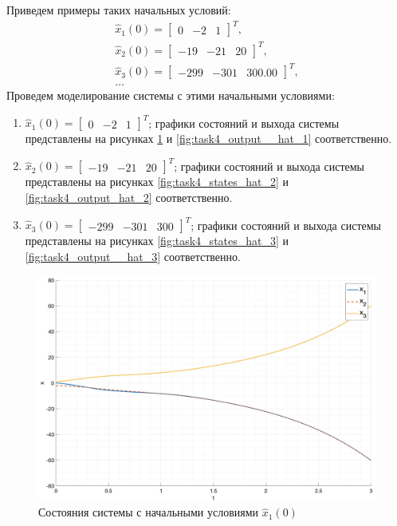 Приведем примеры таких начальных условий:
\begin{equation}
    \begin{array}{cc}
        \hat{x}_1(0) = \begin{bmatrix}
            0 & -2 & 1
        \end{bmatrix}^T, \\
        \hat{x}_2(0) = \begin{bmatrix}
            -19 & -21 & 20
        \end{bmatrix}^T, \\
        \hat{x}_3(0) = \begin{bmatrix}
            -299 & -301 & 300.00 
        \end{bmatrix}^T, \\
        \ldots
    \end{array}
\end{equation}
Проведем моделирование системы с этими начальными условиями: 
\begin{enumerate}
    \item $\hat{x}_1(0) = \begin{bmatrix}
        0 & -2 & 1
    \end{bmatrix}^T$; графики состояний и выхода системы представлены на рисунках \ref{fig:task4_states_hat_1} и \ref{fig:task4_output__hat_1} соответственно.
    \item $\hat{x}_2(0) = \begin{bmatrix}
        -19 & -21 & 20
    \end{bmatrix}^T$; графики состояний и выхода системы представлены на рисунках \ref{fig:task4_states_hat_2} и \ref{fig:task4_output_hat_2} соответственно.
    \item $\hat{x}_3(0) = \begin{bmatrix}
        -299 & -301 & 300 
    \end{bmatrix}^T$; графики состояний и выхода системы представлены на рисунках \ref{fig:task4_states_hat_3} и \ref{fig:task4_output__hat_3} соответственно.
\end{enumerate}

\begin{figure}[ht!]
    \centering
    \includegraphics[width=\textwidth]{media/plots/task4_states_hat_1.png}
    \caption{Состояния системы с начальными условиями $\hat{x}_1(0)$}
    \label{fig:task4_states_hat_1}
\end{figure}

